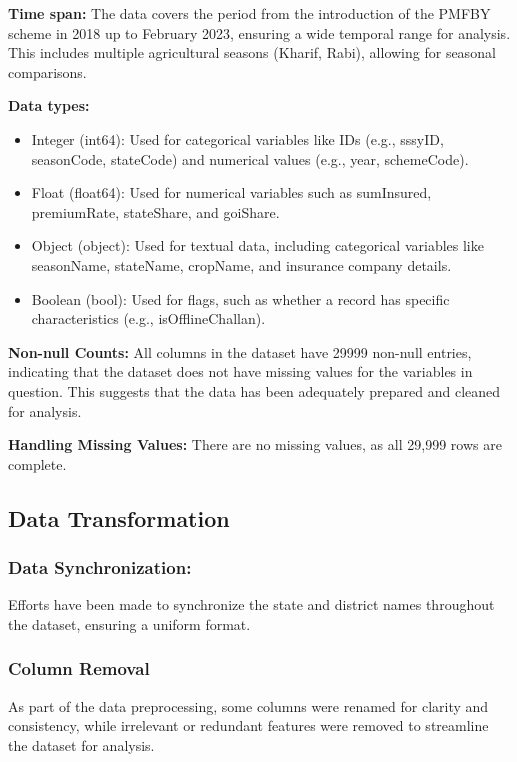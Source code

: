 \documentclass[12pt]{article}
\begin{document}
\textbf{Time span:} The data covers the period from the introduction of the PMFBY scheme in 2018 up to February 2023, ensuring a wide temporal range for analysis. This includes multiple agricultural seasons (Kharif, Rabi), allowing for seasonal comparisons.
\vspace{5pt}

\textbf{Data types:}
\begin{itemize}
\item{Integer (int64): Used for categorical variables like IDs (e.g., sssyID, seasonCode, stateCode) and numerical values (e.g., year, schemeCode).}
\item{Float (float64): Used for numerical variables such as sumInsured, premiumRate, stateShare, and goiShare.}
\item{Object (object): Used for textual data, including categorical variables like seasonName, stateName, cropName, and insurance company details.}
\item{Boolean (bool): Used for flags, such as whether a record has specific characteristics (e.g., isOfflineChallan).}
\end{itemize}
\vspace{5pt}

\textbf{Non-null Counts: }
All columns in the dataset have 29999 non-null entries, indicating that the dataset does not have missing values for the variables in question. This suggests that the data has been adequately prepared and cleaned for analysis.
\vspace{5pt}

\textbf{Handling Missing Values: }There are no missing values, as all 29,999 rows are complete.
\vspace{5pt}
\subsection{Data Transformation}
\subsubsection{Data Synchronization: } Efforts have been made to synchronize the state and district names throughout the dataset, ensuring a uniform format.
\subsubsection{Column Removal}

As part of the data preprocessing, some columns were renamed for clarity and consistency, while irrelevant or redundant features were removed to streamline the dataset for analysis.\\
\end{document}
